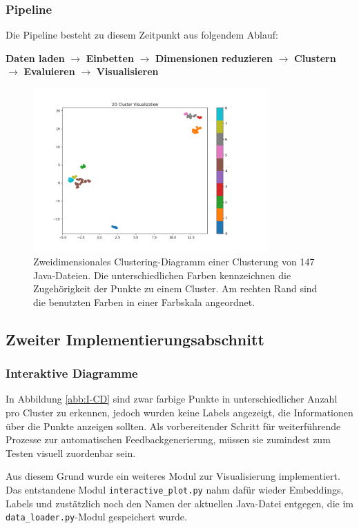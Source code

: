 \subsubsection*{Pipeline}
Die Pipeline besteht zu diesem Zeitpunkt aus folgendem Ablauf:

\textbf{Daten laden} $\rightarrow$ \textbf{Einbetten} $\rightarrow$ \textbf{Dimensionen reduzieren} $\rightarrow$ \textbf{Clustern} $\rightarrow$ \textbf{Evaluieren} $\rightarrow$ \textbf{Visualisieren}

\begin{figure} %
	\centering
	\includegraphics[width=0.8\textwidth]{images/Erstes Clustering-Diagramm.pdf}
	\caption{Zweidimensionales Clustering-Diagramm einer Clusterung von 147 Java-Dateien. Die unterschiedlichen Farben kennzeichnen die Zugehörigkeit der Punkte zu einem Cluster. Am rechten Rand sind die benutzten Farben in einer Farbskala angeordnet.}
	\label{abb:E-CD}
\end{figure}


\subsection{Zweiter Implementierungsabschnitt}
\subsubsection*{Interaktive Diagramme}
In Abbildung \ref{abb:I-CD} sind zwar farbige Punkte in unterschiedlicher Anzahl pro Cluster zu erkennen, jedoch wurden keine Labels angezeigt, die Informationen über die Punkte anzeigen sollten. Als vorbereitender Schritt für weiterführende Prozesse zur automatischen Feedbackgenerierung, müssen sie zumindest zum Testen visuell zuordenbar sein.

Aus diesem Grund wurde ein weiteres Modul zur Visualisierung implementiert. Das entstandene Modul \texttt{interactive\_plot.py} nahm dafür wieder Embeddings, Labels und zustätzlich noch den Namen der aktuellen Java-Datei entgegen, die im \texttt{data\_loader.py}-Modul gespeichert wurde.

